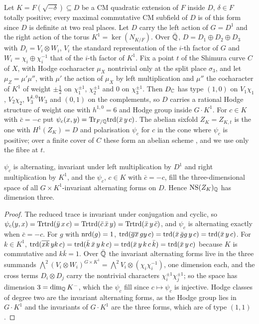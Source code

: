 \begin{setup}\label{setup:zk}
Let $K=F(\sqrt{-\delta})\subseteq D$ be a CM quadratic extension of $F$ inside $D$, $\delta\in F$ totally positive; every maximal commutative CM subfield of $D$ is of this form since $D$ is definite at two real places. Let $D$ carry the left action of $G=D^{1}$ and the right action of the torus $K^{1}=\ker(N_{K/F})$. Over $\bar{\mathbb{Q}}$, $D=D_{1}\oplus D_{2}\oplus D_{3}$ with $D_{i}=V_{i}\otimes W_{i}$, $V_{i}$ the standard representation of the $i$-th factor of $G$ and $W_{i}=\chi_{i}\oplus\chi_{i}^{-1}$ that of the $i$-th factor of $K^{1}$. Fix a point $t$ of the Shimura curve $C$ of $X$, with Hodge cocharacter $\mu_{X}$ nontrivial only at the split place $\sigma_{3}$, and let $\mu_{Z}=\mu'\mu''$, with $\mu'$ the action of $\mu_{X}$ by left multiplication and $\mu''$ the cocharacter of $K^{1}$ of weight $\pm\tfrac12$ on $\chi_{1}^{\pm1}$, $\chi_{2}^{\pm1}$ and $0$ on $\chi_{3}^{\pm1}$. Then $D_{\mathbb{C}}$ has type $(1,0)$ on $V_{1}\chi_{1}$, $V_{2}\chi_{2}$, $V_{3}^{1,0}W_{3}$ and $(0,1)$ on the complements, so $D$ carries a rational Hodge structure of weight one with $h^{1,0}=6$ and Hodge group inside $G\cdot K^{1}$. For $c\in K$ with $\bar c=-c$ put $\psi_{c}(x,y)=\mathrm{Tr}_{F/\mathbb{Q}}\mathrm{trd}(\bar x\,y\,c)$. The abelian sixfold $Z_{K}=Z_{K,t}$ is the one with $H^{1}(Z_{K})=D$ and polarisation $\psi_{c}$ for $c$ in the cone where $\psi_{c}$ is positive; over a finite cover of $C$ these form an abelian scheme \cite{Shi63}, and we use only the fibre at $t$.
\end{setup}

\begin{lemma}\label{lem:polarisations}
$\psi_{c}$ is alternating, invariant under left multiplication by $D^{1}$ and right multiplication by $K^{1}$, and the $\psi_{c}$, $c\in K$ with $\bar c=-c$, fill the three-dimensional space of all $G\times K^{1}$-invariant alternating forms on $D$. Hence $\mathrm{NS}(Z_{K})_{\mathbb{Q}}$ has dimension three.
\end{lemma}

\begin{proof}
The reduced trace is invariant under conjugation and cyclic, so $\psi_{c}(y,x)=\mathrm{Tr}\mathrm{trd}(\bar y\,x\,c)=\mathrm{Tr}\mathrm{trd}(\bar c\,\bar x\,y)=\mathrm{Tr}\mathrm{trd}(\bar x\,y\,\bar c)$, and $\psi_{c}$ is alternating exactly when $\bar c=-c$. For $g$ with $\mathrm{nrd}(g)=1$, $\mathrm{trd}(\overline{gx}\,gy\,c)=\mathrm{trd}(\bar x\,\bar g g\,y\,c)=\mathrm{trd}(\bar x\,y\,c)$. For $k\in K^{1}$, $\mathrm{trd}(\overline{xk}\,yk\,c)=\mathrm{trd}(\bar k\,\bar x\,y\,k\,c)=\mathrm{trd}(\bar x\,y\,k\,c\,\bar k)=\mathrm{trd}(\bar x\,y\,c)$ because $K$ is commutative and $k\bar k=1$. Over $\bar{\mathbb{Q}}$ the invariant alternating forms live in the three summands $\bigwedge^{2}(V_{i}\otimes W_{i})^{G\times K^{1}}=\bigwedge^{2}V_{i}\otimes(\chi_{i}\chi_{i}^{-1})$, one dimension each, and the cross terms $D_{i}\otimes D_{j}$ carry the nontrivial characters $\chi_{i}^{\pm1}\chi_{j}^{\pm1}$; so the space has dimension $3=\dim_{\mathbb{Q}}K^{-}$, which the $\psi_{c}$ fill since $c\mapsto\psi_{c}$ is injective. Hodge classes of degree two are the invariant alternating forms, as the Hodge group lies in $G\cdot K^{1}$ and the invariants of $G\cdot K^{1}$ are the three forms, which are of type $(1,1)$.
\end{proof}

